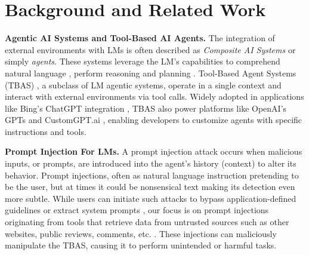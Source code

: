 \section{Background and Related Work}

\textbf{Agentic AI Systems and Tool-Based AI Agents.}
The integration of external environments with LMs is often described as \textit{Composite AI Systems} \cite{compositeAI} or simply \textit{agents}\cite{llm_powered_agents,guide_to_llm_abst}. These systems leverage the LM’s capabilities to comprehend natural language \cite{ouyang2022instruction}, perform reasoning \cite{wei2023chainofthoughtpromptingelicitsreasoning,zelikman2024quietstarlanguagemodelsteach, renze2024selfreflectionllmagentseffects} and planning \cite{huang2022languagemodelszeroshotplanners, wang2023planandsolvepromptingimprovingzeroshot, masterman2024landscapeemergingaiagent}. Tool-Based Agent Systems (TBAS) \cite{ReAct}, a subclass of LM agentic systems, operate in a single context and interact with external environments via tool calls. Widely adopted in applications like Bing’s ChatGPT integration \cite{microsoft_AI_bing_chatgpt}, TBAS also power platforms like OpenAI’s GPTs \cite{openai_gpts} and CustomGPT.ai \cite{customgpt_ai}, enabling developers to customize agents with specific instructions and tools.

\textbf{Prompt Injection For LMs.}
A prompt injection attack\cite{liu2024formalizing, liu2024promptinjectionattackllmintegrated} occurs when malicious inputs, or prompts, are introduced into the agent’s history (context) to alter its behavior. Prompt injections, often as natural language instruction pretending to be the user, but at times it could be nonsensical text making its detection even more subtle\cite{zou2023universalattack}. While users can initiate such attacks to bypass application-defined guidelines \cite{liu2024autodangeneratingstealthyjailbreak} or extract system prompts \cite{yang2024prsapromptstealingattacks}, our focus is on prompt injections originating from tools that retrieve data from untrusted sources such as other websites, public reviews, comments, etc. \cite{debenedetti2024agentdojo,zhan2024injecagentbenchmarkingindirectprompt}. These injections can maliciously manipulate the TBAS, causing it to perform unintended or harmful tasks. 

